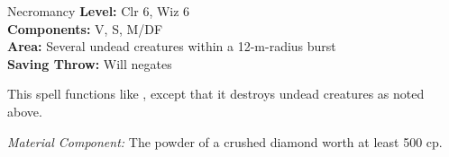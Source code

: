 {Necromancy}
{
	\textbf{Level:}
	Clr 6, Wiz 6\\
	\textbf{Components:}
	V, S, M/DF\\
	\textbf{Area:}
	Several undead creatures within a 12-m-radius burst\\
	\textbf{Saving Throw:}
	Will negates\\
}
{
	This spell functions like , except that it destroys undead creatures as noted above.

	\textit{Material Component:}
	The powder of a crushed diamond worth at least 500 cp.

}
